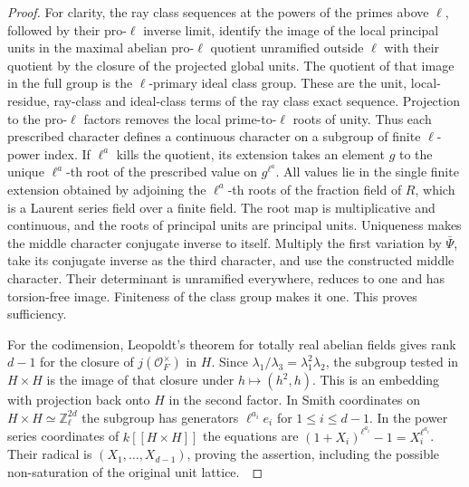 \documentclass[a4paper,11pt]{article}
\theoremstyle{definition}
\theoremstyle{remark}
\newcommand{\ZZ}{\mathbb Z}\newcommand{\ord}{\operatorname{ord}}
\numberwithin{equation}{section}
\begin{document}
\begin{proof}
For clarity, the ray class sequences at the powers of the
primes above \(\ell\), followed by their pro-\(\ell\) inverse
limit, identify the image of the local principal units in the
maximal abelian pro-\(\ell\) quotient unramified outside
\(\ell\) with their quotient by the closure of the projected
global units. The quotient of that image in the full group is
the \(\ell\)-primary ideal class group. These are the unit,
local-residue, ray-class and ideal-class terms of the ray
class exact sequence. Projection to the pro-\(\ell\) factors
removes the local prime-to-\(\ell\) roots of unity.
Thus each prescribed character defines a continuous character
on a subgroup of finite \(\ell\)-power index. If \(\ell^a\)
kills the quotient, its extension takes an element \(g\) to
the unique \(\ell^a\)-th root of the prescribed value on
\(g^{\ell^a}\). All values lie in the single finite extension
obtained by adjoining the \(\ell^a\)-th roots of the fraction field of \(R\),
which is a Laurent series field over a finite field. The
root map is multiplicative and continuous, and the roots of
principal units are principal units. Uniqueness makes the
middle character conjugate inverse to itself. Multiply the
first variation by \(\bar\Psi\), take its conjugate inverse
as the third character, and use the constructed middle
character. Their determinant is unramified everywhere,
reduces to one and has torsion-free image. Finiteness of the
class group makes it one. This proves sufficiency.

For the codimension, Leopoldt's theorem for totally real
abelian fields gives rank \(d-1\) for the closure of
\(j(\mathcal O_F^\times)\) in \(H\). Since
\(\lambda_1/\lambda_3=\lambda_1^2\lambda_2\), the subgroup
tested in \(H\times H\) is the image of that closure under
\(h\mapsto(h^2,h)\). This is an embedding with projection
back onto \(H\) in the second factor. In Smith coordinates on
\(H\times H\simeq\ZZ_\ell^{2d}\) the subgroup has generators
\(\ell^{a_i}e_i\) for \(1\le i\le d-1\). In the power series
coordinates of \(k[[H\times H]]\) the equations are
\((1+X_i)^{\ell^{a_i}}-1=X_i^{\ell^{a_i}}\). Their radical
is \((X_1,\ldots,X_{d-1})\), proving the assertion, including
the possible non-saturation of the original unit
lattice.~\cite{VII-V-brumer330}
\end{proof}
\end{document}
